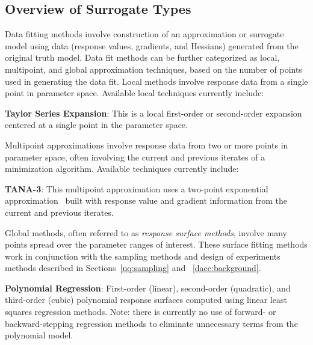 \subsection{Overview of Surrogate Types}


Data fitting methods involve construction of an approximation or
surrogate model using data (response values, gradients, and Hessians)
generated from the original truth model.  Data fit methods can be
further categorized as local, multipoint, and global approximation
techniques, based on the number of points used in generating the data
fit.  Local methods involve response data from a single point in
parameter space.  Available local techniques currently include:

\textbf{Taylor Series Expansion}: This is a local first-order or
second-order expansion centered at a single point in the parameter space.

Multipoint approximations involve response data from two or more
points in parameter space, often involving the current and previous
iterates of a minimization algorithm.  Available techniques currently
include:

\textbf{TANA-3}: This multipoint approximation uses a two-point
exponential approximation~\cite{Xu98,Fad90} built with response value
and gradient information from the current and previous iterates.

Global methods, often referred to as \emph{response surface methods},
involve many points spread over the parameter ranges of interest.
These surface fitting methods work in conjunction with the sampling
methods and design of experiments methods described in
Sections~\ref{uq:sampling} and ~\ref{dace:background}.

\textbf{Polynomial Regression}: First-order (linear), second-order
(quadratic), and third-order (cubic) polynomial response surfaces
computed using linear least squares regression methods. Note: there is
currently no use of forward- or backward-stepping regression methods
to eliminate unnecessary terms from the polynomial model.

